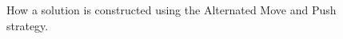 \begin{figure}[htp]
\caption{How a solution is constructed using the Alternated Move and Push strategy.}\label{fig:alternated_move_and_push_construction}
\end{figure}